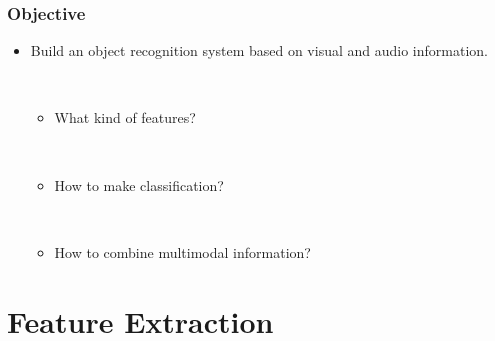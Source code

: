 \documentclass{beamer}
\begin{document}
\begin{frame}
  \frametitle{Objective}

  \begin{itemize}
    \item Build an object recognition system based on visual and audio information.

      ~
      \begin{itemize}
        \item What kind of features?

          ~
        \item How to make classification?

          ~
        \item How to combine multimodal information?
      \end{itemize}
  \end{itemize}
\end{frame}

\iffalse
\begin{frame}
  \frametitle{Two Tasks of Object Recognition}

  \begin{itemize}
    \item Specific object recognition.
      \texttt{[image: specific.tikz]}

    \item Generic category recognition.
      \texttt{[image: generic.tikz]}
  \end{itemize}
\end{frame}
\fi

\section{Feature Extraction}
\iffalse
\begin{frame}
  \frametitle{Bag-of-Words Model with SIFT Descriptors}

  \begin{itemize}
    \item SIFT Descriptor~\cite{lowe_object_1999}. 
      \begin{itemize}
        \item Local feature descriptor invariant to several image transforms.
        \item Standard for object recognition in robotics.

          ~
        \item Does not describe the whole image/object.
        \item Does not encode general features of a category.
      \end{itemize}
  \end{itemize}

  \centering
  \texttt{[image: mug2m]}
\end{frame}
\fi
\end{document}
